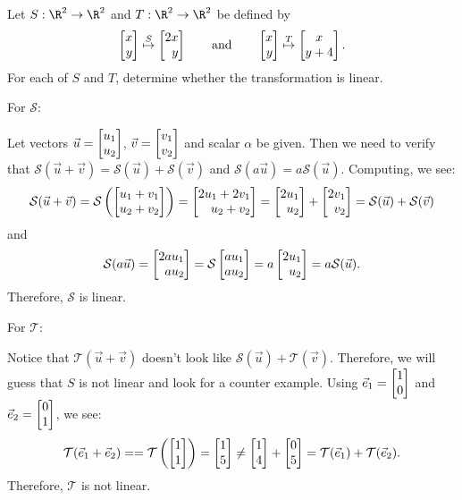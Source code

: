 \begin{example}
	Let $S:\R^2\to\R^2$ and $T:\R^2\to\R^2$ be defined by
	\[
		\mat{x\\y}\stackrel{S}{\mapsto}\mat{2x\\y}\qquad\text{and}\qquad
		\mat{x\\y}\stackrel{T}{\mapsto}\matc{x\\y+4}.
	\]
	For each of $S$ and $T$, determine whether the transformation is linear.

	For $\mathcal S$:
	
	Let vectors $\vec u=\mat{u_1\\u_2}$, $\vec v=\mat{v_1\\v_2}$ and scalar $\alpha$ be given. Then we need to verify that $\mathcal S(\vec u+\vec v)=\mathcal S(\vec u)+\mathcal S(\vec v)$ and $\mathcal S(a\vec u)=a\mathcal S(\vec u)$. Computing, we see:
	\[
	    \mathcal S(\vec u +\vec v)=\mathcal S\left(\mat{u_1+v_1\\u_2+v_2}\right)=\mat{2u_1+2v_1\\u_2+v_2}=\mat{2u_1\\u_2}+\mat{2v_1\\v_2}=\mathcal S(\vec u) + \mathcal S(\vec v)
	\]
	and
	\[
	    \mathcal S(a\vec u)=\mat{2a u_1\\a u_2}=\mathcal S\mat{a u_1\\a u_2}=a\mat{2 u_1\\ u_2}=a\mathcal S(\vec u).
	\]
	Therefore, $\mathcal S$ is linear.
	
	For $\mathcal T$:
	
	Notice that $\mathcal T(\vec u+\vec v)$ doesn't look like $\mathcal S(\vec u)+\mathcal T(\vec v)$. Therefore, we will guess that $S$ is not linear and look for a counter example. Using $\xhat=\mat{1\\0}$ and $\yhat=\mat{0\\1}$, we see:
	\[
	    \mathcal T(\xhat +\yhat)==\mathcal T\left(\mat{1\\1}\right)=\mat{1\\5} \neq \mat{1\\4}+\mat{0\\5}=\mathcal T(\xhat) + \mathcal T(\yhat).
	\]
	Therefore, $\mathcal T$ is not linear.
\end{example}


